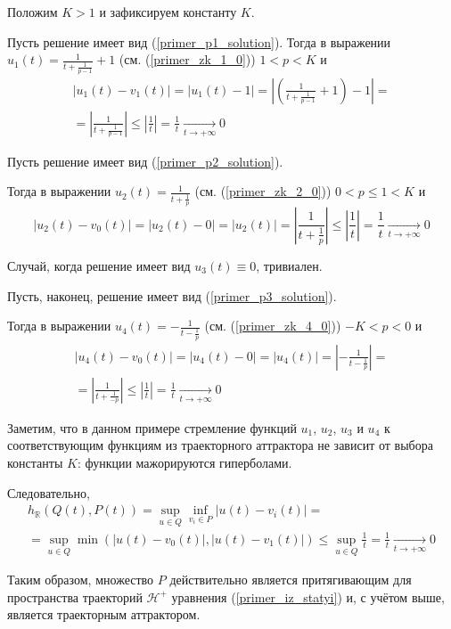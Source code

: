 Положим $K>1$ и зафиксируем константу $K$.

Пусть решение имеет вид (\ref{primer_p1_solution}).
Тогда в выражении $u_1(t)=\frac{1}{t+\frac{1}{p-1}}+1$  (см. (\ref{primer_zk_1_0})) $1<p<K$ и
\begin{multline}
	|u_1(t) - v_1(t)| =
	|u_1(t) - 1| =
	\left|\left(\frac{1}{t+\frac{1}{p-1}}+1\right) -1\right| =
	\\ =
	\left|\frac{1}{t+\frac{1}{p-1}}\right| \leq
	\left|\frac{1}{t}\right| =
	\frac{1}{t}
	\xrightarrow[t\to+\infty]{}0
\end{multline}

Пусть решение имеет вид (\ref{primer_p2_solution}).

Тогда в выражении $u_2(t)=\frac{1}{t+\frac{1}{p}}$  (см. (\ref{primer_zk_2_0})) $0 < p \leq 1 < K$ и
\begin{equation}
	|u_2(t) - v_0(t)| =
	|u_2(t) - 0| =
	|u_2(t)| =
	\left| \frac{1}{t+\frac{1}{p}} \right| \leq
	\left|\frac{1}{t}\right| =
	\frac{1}{t}
	\xrightarrow[t\to+\infty]{}0
\end{equation}

Случай, когда решение имеет вид $u_3(t) \equiv 0$, тривиален.

Пусть, наконец, решение имеет вид (\ref{primer_p3_solution}).

Тогда в выражении $u_4(t)=-\frac{1}{t-\frac{1}{p}}$  (см. (\ref{primer_zk_4_0})) $-K < p < 0$ и
\begin{multline}
	|u_4(t) - v_0(t)| =
	|u_4(t) - 0| =
	|u_4(t)| =
	\left| -\frac{1}{t-\frac{1}{p}} \right| =
	\\ =
	\left| \frac{1}{t+\frac{1}{-p}} \right| \leq
	\left|\frac{1}{t}\right| =
	\frac{1}{t}
	\xrightarrow[t\to+\infty]{}0
\end{multline}

Заметим, что в данном примере стремление функций $u_1$, $u_2$, $u_3$ и $u_4$ к соответствующим функциям из траекторного аттрактора не зависит от выбора константы $K$: функции мажорируются гиперболами.

Следовательно,
\begin{multline}
	h_{\mathbb{R}}(Q(t),P(t)) =
	\sup_{u\in Q} \inf_{v_i \in P} |u(t) - v_i(t)| =
	\\ =
	\sup_{u\in Q} \min(|u(t) - v_0(t)|,|u(t) - v_1(t)|) \leq
	\sup_{u\in Q} \frac{1}{t} =
	\frac{1}{t}
	\xrightarrow[t\to+\infty]{}0
\end{multline}

Таким образом, множество $P$ действительно является притягивающим для пространства траекторий $\mathcal{H}^+$ уравнения (\ref{primer_iz_statyi}) и, с учётом выше, является траекторным аттрактором.

